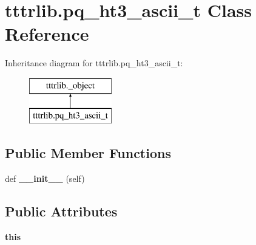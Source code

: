 \hypertarget{classtttrlib_1_1pq__ht3__ascii__t}{}\section{tttrlib.\+pq\+\_\+ht3\+\_\+ascii\+\_\+t Class Reference}
\label{classtttrlib_1_1pq__ht3__ascii__t}
Inheritance diagram for tttrlib.\+pq\+\_\+ht3\+\_\+ascii\+\_\+t\+:\begin{figure}[H]
\begin{center}
\leavevmode
\includegraphics[height=2.000000cm]{classtttrlib_1_1pq__ht3__ascii__t}
\end{center}
\end{figure}
\subsection*{Public Member Functions}
\begin{DoxyCompactItemize}
\item 
\mbox{\label{classtttrlib_1_1pq__ht3__ascii__t_a3f96df7f1b6141b183c60c5ce0346251}} 
def {\bfseries \+\_\+\+\_\+init\+\_\+\+\_\+} (self)
\end{DoxyCompactItemize}
\subsection*{Public Attributes}
\begin{DoxyCompactItemize}
\item 
\mbox{\label{classtttrlib_1_1pq__ht3__ascii__t_ad1111177e3e2be574c8859227a8f1dfe}} 
{\bfseries this}
\end{DoxyCompactItemize}
